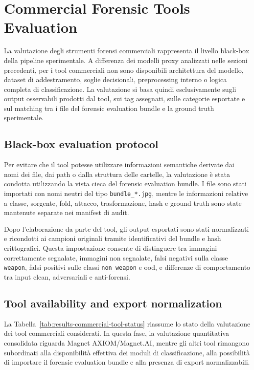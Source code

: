 \section{Commercial Forensic Tools Evaluation}
\label{sec:results-commercial}

La valutazione degli strumenti forensi commerciali rappresenta il livello
black-box della pipeline sperimentale. A differenza dei modelli proxy analizzati
nelle sezioni precedenti, per i tool commerciali non sono disponibili
architettura del modello, dataset di addestramento, soglie decisionali,
preprocessing interno o logica completa di classificazione. La valutazione si
basa quindi esclusivamente sugli output osservabili prodotti dal tool, sui tag
assegnati, sulle categorie esportate e sul matching tra i file del forensic
evaluation bundle e la ground truth sperimentale.


\subsection{Black-box evaluation protocol}
\label{subsec:results-commercial-protocol}

Per evitare che il tool potesse utilizzare informazioni semantiche derivate dai
nomi dei file, dai path o dalla struttura delle cartelle, la valutazione è stata
condotta utilizzando la vista cieca del forensic evaluation bundle. I file sono
stati importati con nomi neutri del tipo \texttt{bundle\_*.jpg}, mentre le
informazioni relative a classe, sorgente, fold, attacco, trasformazione, hash e
ground truth sono state mantenute separate nei manifest di audit.

Dopo l'elaborazione da parte del tool, gli output esportati sono stati
normalizzati e ricondotti ai campioni originali tramite identificativi del
bundle e hash crittografici. Questa impostazione consente di distinguere tra
immagini correttamente segnalate, immagini non segnalate, falsi negativi sulla
classe \texttt{weapon}, falsi positivi sulle classi \texttt{non\_weapon} e
\gls{ood}, e differenze di comportamento tra input clean, adversariali e
anti-forensi.


\subsection{Tool availability and export normalization}
\label{subsec:results-commercial-availability}

La Tabella~\ref{tab:results-commercial-tool-status} riassume lo stato della
valutazione dei tool commerciali considerati. In questa fase, la valutazione
quantitativa consolidata riguarda Magnet AXIOM/Magnet.AI, mentre gli altri tool
rimangono subordinati alla disponibilità effettiva dei moduli di classificazione,
alla possibilità di importare il forensic evaluation bundle e alla presenza di
export normalizzabili.

